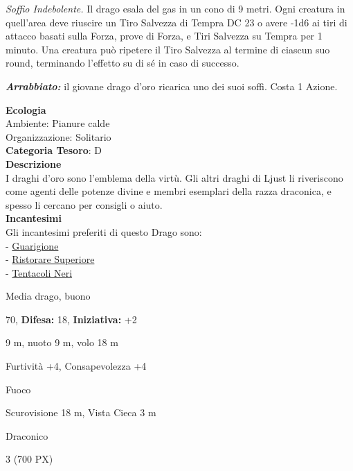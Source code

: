 \begin{multicols}{2}
{\emph{Soffio Indebolente.} Il drago esala del gas in un cono di 9 metri. Ogni creatura in quell'area deve riuscire un Tiro Salvezza di Tempra DC 23 o avere -1d6 ai tiri di attacco basati sulla Forza, prove di Forza, e Tiri Salvezza su Tempra per 1 minuto. Una creatura può ripetere il Tiro Salvezza al termine di ciascun suo round, terminando l'effetto su di sé in caso di successo.

\emph{\textbf{Arrabbiato:}} il giovane drago d'oro ricarica uno dei suoi soffi. Costa 1 Azione.

\textbf{Ecologia}\\
Ambiente: Pianure calde\\
Organizzazione: Solitario\\
\textbf{Categoria Tesoro}: D\\
\textbf{Descrizione}\\
I draghi d'oro sono l'emblema della virtù. Gli altri draghi di Ljust li riveriscono come agenti delle potenze divine e membri esemplari della razza draconica, e spesso li cercano per consigli o aiuto.\\
\textbf{Incantesimi}\\
Gli incantesimi preferiti di questo Drago sono:\\
- \hyperlink{Guarigione}{Guarigione}\\
- \hyperlink{Ristorare Superiore}{Ristorare Superiore}\\
- \hyperlink{Tentacoli Neri}{Tentacoli Neri}

\noindent
\begin{description}[noitemsep, topsep=0pt, parsep=0pt, partopsep=0pt, leftmargin=0cm, labelwidth=2.2cm]
	\item[\textbf{Taglia/Tipo:}] Media drago, buono
	\item[\textbf{Caratt.:}] 
	\item[\textbf{Punti Ferita:}] 70,  \textbf{Difesa:} 18,  \textbf{Iniziativa:} +2
	\item[\textbf{Movimento:}] 9 m, nuoto 9 m, volo 18 m
	\item[\textbf{Tiri Salvez.:}] 
	\item[\textbf{Comp.:}] Furtività +4, Consapevolezza +4
	\item[\textbf{Imm. Danni:}] Fuoco
	\item[\textbf{Sensi:}] Scurovisione 18 m, Vista Cieca 3 m
	\item[\textbf{Linguaggi:}] Draconico
	\item[\textbf{Sfida:}] 3 (700 PX)\smallskip
\end{description}

}
\end{multicols}

